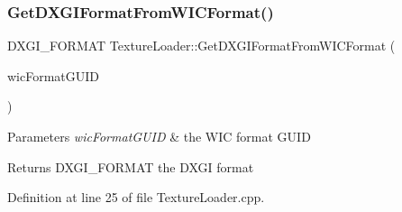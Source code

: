 \subsubsection{\texorpdfstring{Get\+D\+X\+G\+I\+Format\+From\+W\+I\+C\+Format()}{GetDXGIFormatFromWICFormat()}}
{\footnotesize\ttfamily D\+X\+G\+I\+\_\+\+F\+O\+R\+M\+AT Texture\+Loader\+::\+Get\+D\+X\+G\+I\+Format\+From\+W\+I\+C\+Format (\begin{DoxyParamCaption}\item[{W\+I\+C\+Pixel\+Format\+G\+U\+ID \&}]{wic\+Format\+G\+U\+ID }\end{DoxyParamCaption})\hspace{0.3cm}{\ttfamily [private]}}


\begin{DoxyParams}{Parameters}
{\em wic\+Format\+G\+U\+ID} & the W\+IC format G\+U\+ID \\
\hline
\end{DoxyParams}
\begin{DoxyReturn}{Returns}
D\+X\+G\+I\+\_\+\+F\+O\+R\+M\+AT the D\+X\+GI format 
\end{DoxyReturn}


Definition at line 25 of file Texture\+Loader.\+cpp.


